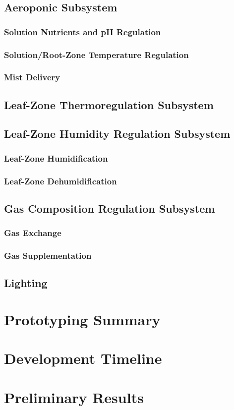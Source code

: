 \documentclass{../tex/report}
\begin{document}
\subsection{Aeroponic Subsystem}
\subsubsection{Solution Nutrients and pH Regulation}
\subsubsection{Solution/Root-Zone Temperature Regulation}
\subsubsection{Mist Delivery}
\subsection{Leaf-Zone Thermoregulation Subsystem}
\subsection{Leaf-Zone Humidity Regulation Subsystem}
\subsubsection{Leaf-Zone Humidification}
\subsubsection{Leaf-Zone Dehumidification}
\subsection{Gas Composition Regulation Subsystem}
\subsubsection{Gas Exchange}
\subsubsection{Gas Supplementation}
\subsection{Lighting}

\section{Prototyping Summary}

\section{Development Timeline}

\section{Preliminary Results}

\newpage



\end{document}
